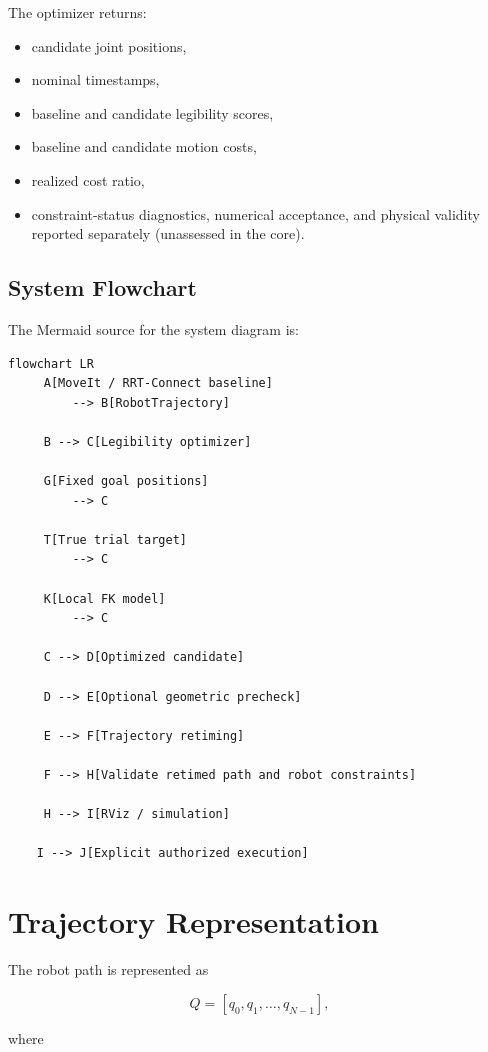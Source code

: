 \documentclass[11pt]{article}
\begin{document}
The optimizer returns:

\begin{itemize}
    \item candidate joint positions,
    \item nominal timestamps,
    \item baseline and candidate legibility scores,
    \item baseline and candidate motion costs,
    \item realized cost ratio,

    \item constraint-status diagnostics, numerical acceptance, and
          physical validity reported separately (unassessed in the core).
\end{itemize}

\subsection{System Flowchart}

The Mermaid source for the system diagram is:

\begin{lstlisting}
flowchart LR
     A[MoveIt / RRT-Connect baseline]
         --> B[RobotTrajectory]

     B --> C[Legibility optimizer]

     G[Fixed goal positions]
         --> C

     T[True trial target]
         --> C

     K[Local FK model]
         --> C

     C --> D[Optimized candidate]

     D --> E[Optional geometric precheck]

     E --> F[Trajectory retiming]

     F --> H[Validate retimed path and robot constraints]

     H --> I[RViz / simulation]

    I --> J[Explicit authorized execution]
\end{lstlisting}

\section{Trajectory Representation}

The robot path is represented as

\[
Q =
[q_0,q_1,\ldots,q_{N-1}],
\]

where
\end{document}
